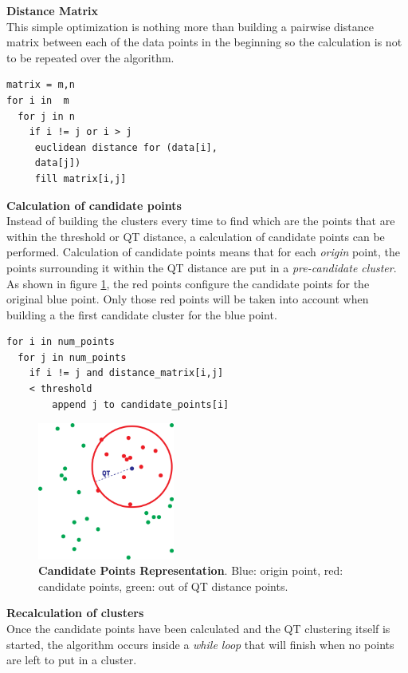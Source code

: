 \noindent \textbf{Distance Matrix}\\
\noindent This simple optimization is nothing more than building a pairwise distance matrix between each of the data points in the beginning so the calculation is not to be repeated over the algorithm.

\begin{verbatim}
matrix = m,n
for i in  m
  for j in n
    if i != j or i > j 
     euclidean distance for (data[i],
     data[j])
     fill matrix[i,j]
\end{verbatim}

\noindent \textbf{Calculation of candidate points}\\
\noindent Instead of building the clusters every time to find which are the points that are within the threshold or QT distance, a calculation of candidate points can be performed. Calculation of candidate points means that for each \textit{origin} point, the points surrounding it within the QT distance are put in a \textit{pre-candidate cluster}. As shown in figure \ref{fig:candidate_points}, the red points configure the candidate points for the original blue point. Only those red points will be taken into account when building a the first candidate cluster for the blue point. 

\begin{verbatim}
for i in num_points
  for j in num_points
    if i != j and distance_matrix[i,j]
    < threshold
        append j to candidate_points[i]
\end{verbatim}

\begin{figure}[h]
    \centering
    \includegraphics[width=0.4\textwidth]{images/CANDIDATE.png}
    \caption{\textbf{Candidate Points Representation}. Blue: origin point, red: candidate points, green: out of QT distance points.}
    \label{fig:candidate_points}
\end{figure}

\noindent \textbf{Recalculation of clusters}\\
Once the candidate points have been calculated and the QT clustering itself is started,  the algorithm occurs inside a \textit{while loop} that will finish when no points are left to put in a cluster. \\


